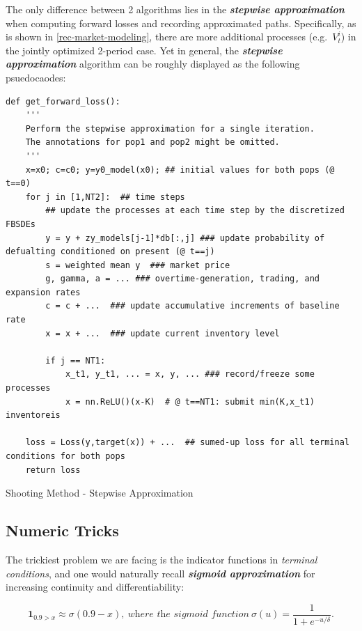 \documentclass[a4paper,10pt]{article}
\newcommand{\1}{\mathbf{1}}
\begin{document}
The only difference between 2 algorithms lies in the \textbf{\textit{stepwise
approximation}} when computing forward losses and recording approximated
paths. Specifically, as is shown in \ref{rec-market-modeling}, there are more additional processes (e.g.~\(V_t^i\)) in the jointly optimized 2-period case. Yet in general, the \textbf{\textit{stepwise
approximation}} algorithm can be roughly displayed as the following
psuedocaodes:

\begin{algorithm}[h]
\begin{verbatim}
def get_forward_loss():
    '''
    Perform the stepwise approximation for a single iteration. 
    The annotations for pop1 and pop2 might be omitted.
    '''
    x=x0; c=c0; y=y0_model(x0); ## initial values for both pops (@ t==0)
    for j in [1,NT2]:  ## time steps
        ## update the processes at each time step by the discretized FBSDEs
        y = y + zy_models[j-1]*db[:,j] ### update probability of defualting conditioned on present (@ t==j)
        s = weighted mean y  ### market price
        g, gamma, a = ... ### overtime-generation, trading, and expansion rates 
        c = c + ...  ### update accumulative increments of baseline rate
        x = x + ...  ### update current inventory level

        if j == NT1:
            x_t1, y_t1, ... = x, y, ... ### record/freeze some processes 
            x = nn.ReLU()(x-K)  # @ t==NT1: submit min(K,x_t1) inventoreis

    loss = Loss(y,target(x)) + ...  ## sumed-up loss for all terminal conditions for both pops
    return loss 
\end{verbatim}
\caption{Shooting Method - Stepwise Approximation} 
\label{alg:stepwise-approx}
\end{algorithm}

\subsection{Numeric Tricks}\label{numeric-tricks}

The trickiest problem we are facing is the indicator functions in
\emph{terminal conditions}, and one would naturally recall
\textbf\textit{sigmoid approximation} for increasing continuity and
differentiability:

\begin{equation}
    \1_{0.9>x} \approx \sigma(0.9-x), ~\textit{where the sigmoid function}~\sigma(u)=\frac{1}{1+e^{-u/\delta}}.
\end{equation}
\end{document}
